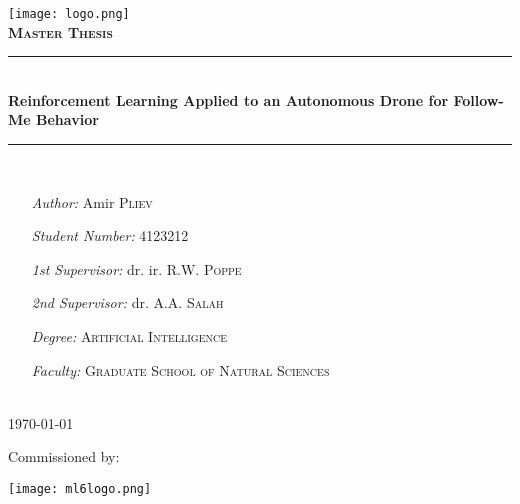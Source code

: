 
\begin{titlepage}

\newcommand{\HRule}{\rule{\linewidth}{0.5mm}} %

\center %
 

\texttt{[image: logo.png]}\\[1cm] %
\textsc{\Large \textbf{Master Thesis}}\\[0.5cm] %


\HRule \\[0.4cm]
{ \huge \bfseries Reinforcement Learning Applied to an Autonomous Drone for Follow-Me Behavior}\\[0.4cm] %
\HRule \\[1.0cm]
 

\begin{minipage}[t]{0.65\textwidth}
	\begin{itemize}
	\item[\emph{Author:}] Amir \textsc{Pliev}
	\item[\emph{Student Number:}] 4123212 
	\item[\emph{1st Supervisor:}] dr. ir. R.W. \textsc{Poppe}
	\item[\emph{2nd Supervisor:}] dr. A.A. \textsc{Salah}
	\item[\emph{Degree:}] \textsc{Artificial Intelligence}
	\item[\emph{Faculty:}]  \textsc{Graduate School of Natural Sciences}
	\end{itemize}
\end{minipage}\\[0.8cm]

{\large \today}\\[1cm]

\begin{center}
	Commissioned by:
\end{center}
\texttt{[image: ml6logo.png]}


\vfill %

\end{titlepage}
